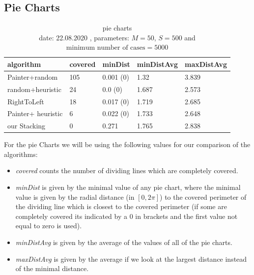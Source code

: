 \documentclass[a4paper,11pt]{article}
\begin{document}
\subsection*{Pie Charts}
\begin{table}[h]
  \begin{center}
    \begin{tabular}{| l || l | l | l | l |}
      \hline
      algorithm & covered & minDist & minDistAvg & maxDistAvg\\
      \hline
      Painter+random & 105  & 0.001 (0) & 1.32 & 3.839\\

      random+heuristic & 24  & 0.0 (0) & 1.687 & 2.573\\

      RightToLeft & 18  & 0.017 (0) & 1.719 & 2.685\\

      Painter+ heuristic & 6  & 0.022 (0) & 1.733 & 2.648\\

      our Stacking & 0 & 0.271 & 1.765 & 2.838\\

      \hline
    \end{tabular}
  \end{center}
  \caption{pie charts\\
  date: 22.08.2020  , parameters: $M=50$, $S=500$ and $\text{minimum number of cases}=5000$  }

\end{table}
For the pie Charts we will be using the following values for our comparison of the algorithms:
\begin{itemize}
  \item \textit{covered} counts the number of dividing lines which are completely covered.
  \item \textit{minDist} is given by the minimal value of any pie chart, where the minimal value is given by the radial distance (in $[0,2\pi]$) to the covered perimeter of the dividing line which is closest to the covered perimeter (if some are completely covered its indicated by a 0 in brackets and the first value not equal to zero is used).
  \item \textit{minDistAvg} is given by the average of the values of all of the pie charts.
  \item \textit{maxDistAvg} is given by the average if we look at the largest distance instead of the minimal distance.
\end{itemize}
\end{document}
